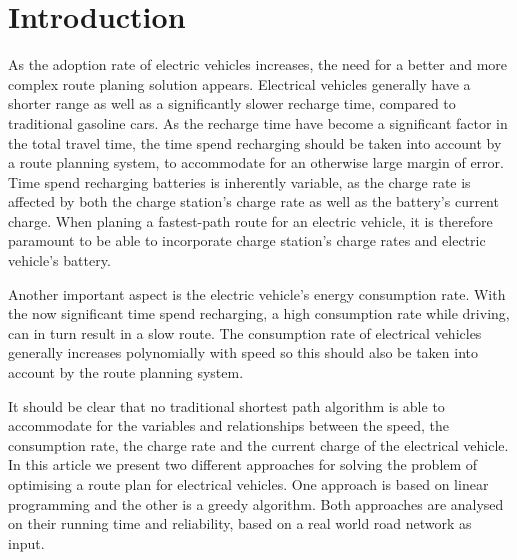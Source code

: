 \section{Introduction}

As the adoption rate of electric vehicles increases, the need for a better and more complex route planing solution appears. Electrical vehicles generally have a shorter range as well as a significantly slower recharge time, compared to traditional gasoline cars. As the recharge time have become a significant factor in the total travel time, the time spend recharging should be taken into account by a route planning system, to accommodate for an otherwise large margin of error. Time spend recharging batteries is inherently variable, as the charge rate is affected by both the charge station's charge rate as well as the battery's current charge. When planing a fastest-path route for an electric vehicle, it is therefore paramount to be able to incorporate charge station's charge rates and electric vehicle's battery.

Another important aspect is the electric vehicle's energy consumption rate. With the now significant time spend recharging, a high consumption rate while driving, can in turn result in a slow route. The consumption rate of electrical vehicles generally increases polynomially with speed so this should also be taken into account by the route planning system.

It should be clear that no traditional shortest path algorithm is able to accommodate for the variables and relationships between the speed, the consumption rate, the charge rate and the current charge of the electrical vehicle. In this article we present two different approaches for solving the problem of optimising a route plan for electrical vehicles. One approach is based on linear programming and the other is a greedy algorithm. Both approaches are analysed on their running time and reliability, based on a real world road network as input.




